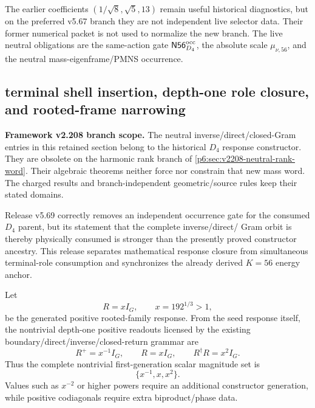 \documentclass[12pt,a4paper]{article}
\begin{document}
\begin{remark}
\label{p6:rem:v567-legacy-radical-status}
\leavevmode\par\noindent
The earlier coefficients
\((1/\sqrt8,\sqrt5,13)\) remain useful historical diagnostics, but on the
preferred v5.67 branch they are not independent live selector data.  Their
former numerical packet is not used to normalize the new branch.  The live
neutral obligations are the same-action gate
\(\mathsf{N56}_{D_4}^{\rm occ}\), the absolute scale
\(\mu_{\nu,56}\), and the neutral mass-eigenframe/PMNS occurrence.
\end{remark}

\subsection{terminal shell insertion, depth-one role closure, and rooted-frame narrowing}
\label{p6:sec:v570-d4-terminal-role-scale-refinement}

\noindent\textbf{Framework v2.208 branch scope.}
The neutral inverse/direct/closed-Gram entries in this retained section
belong to the historical $D_4$ response constructor. They are obsolete
on the harmonic rank branch of \ref{p6:sec:v2208-neutral-rank-word}.
Their algebraic theorems neither force nor constrain that new mass word.
The charged results and branch-independent geometric/source rules keep
their stated domains.


Release v5.69 correctly removes an independent occurrence gate for the
consumed \(D_4\) parent, but its statement that the complete inverse/direct/
Gram orbit is thereby physically consumed is stronger than the presently
proved constructor ancestry.  This release separates mathematical response
closure from simultaneous terminal-role consumption and synchronizes the
already derived \(K=56\) energy anchor.

\begin{theorem}
\label{p6:thm:v570-depth-one-response-closure}
Let
\[
 R=xI_G,\qquad x=192^{1/3}>1,
\]
be the generated positive rooted-family response.  From the seed response
itself, the nontrivial depth-one positive readouts licensed by the existing
boundary/direct/inverse/closed-return grammar are
\[
 \boxed{R^+=x^{-1}I_G,\qquad R=xI_G,\qquad R^\dagger R=x^2I_G.}
\]
Thus the complete nontrivial first-generation scalar magnitude set is
\[
 \boxed{\{x^{-1},x,x^2\}.}
\]
Values such as \(x^{-2}\) or higher powers require an additional constructor
generation, while positive codiagonals require extra biproduct/phase data.
\end{theorem}
\end{document}
